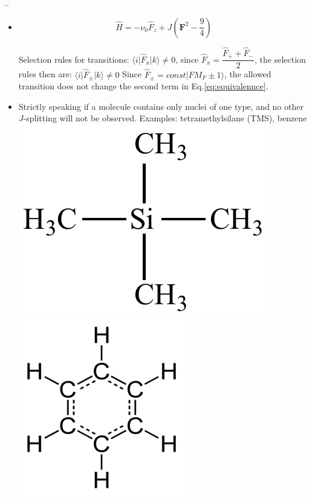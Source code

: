\documentclass[handout]{beamer}
\begin{document}
\begin{frame}{\thesection.\thesubsection. \insertsubsection}

\begin{itemize}[<+>]
	\item
	
	\begin{equation}\label{eq:equivalennce}
	\hat{H} = - \nu_0 \hat{F}_{z} + J (\bm{F}^2 - \dfrac{9}{4} )    
	\end{equation}
	
	Selection rules for transitions: $\langle i \vert  \hat{F}_x \vert k \rangle \neq 0$, since $\hat{F}_x = \dfrac{\hat{F}_{+} + \hat{F}_{-}}{2}$, the selection rules then are: $\langle i \vert  \hat{F}_{\pm} \vert k \rangle \neq 0$
	Since $\hat{F}_{\pm} = const \vert F M_F\pm1 \rangle$, the allowed transition does not change the second term in Eq.\ref{eq:equivalennce}.
	
	\item
	Strictly speaking if a molecule contains only nuclei of one type, and no other $J$-splitting will not be observed. Examples: tetramethylsilane (TMS), benzene
    \includegraphics[scale = 0.5]{tetramethylsilane.png}
    \includegraphics[scale = 0.15]{Benzene-2D-flat.png}
\end{itemize}
\end{frame}
\end{document}
